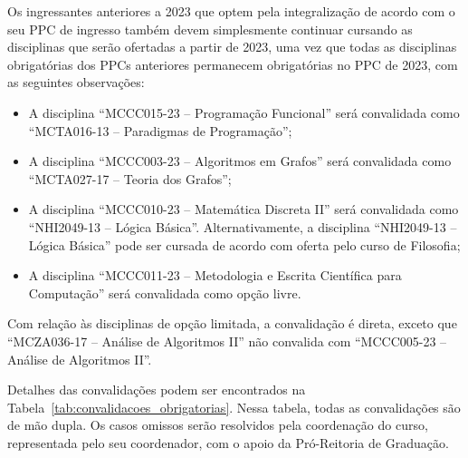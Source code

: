\documentclass[a4paper]{article}
\begin{document}
Os ingressantes anteriores a 2023 que optem pela integralização de acordo com o
seu PPC de ingresso também devem simplesmente continuar cursando as disciplinas
que serão ofertadas a partir de 2023, uma vez que todas as disciplinas
obrigatórias dos PPCs anteriores permanecem obrigatórias no PPC de 2023, com as
seguintes observações:
\begin{itemize}
    \item A disciplina ``MCCC015-23 -- Programação Funcional'' será convalidada
    como ``MCTA016-13 -- Paradigmas de Programação'';
    \item A disciplina ``MCCC003-23 -- Algoritmos em Grafos'' será convalidada
    como ``MCTA027-17 -- Teoria dos Grafos'';
    \item A disciplina ``MCCC010-23 -- Matemática Discreta II'' será
    convalidada como ``NHI2049-13 -- Lógica Básica''.  Alternativamente, a
    disciplina ``NHI2049-13 -- Lógica Básica'' pode ser cursada de acordo com
    oferta pelo curso de Filosofia;
    \item A disciplina ``MCCC011-23 -- Metodologia e Escrita Científica para
    Computação'' será convalidada como opção livre.
\end{itemize}
Com relação às disciplinas de opção limitada, a convalidação é direta, exceto
que ``MCZA036-17 -- Análise de Algoritmos II'' não convalida com
``MCCC005-23 -- Análise de Algoritmos II''.

Detalhes das convalidações podem ser encontrados na
Tabela~\ref{tab:convalidacoes_obrigatorias}.
Nessa tabela, todas as convalidações são de mão dupla.
Os casos omissos serão resolvidos pela coordenação do curso, representada pelo
seu coordenador, com o apoio da Pró-Reitoria de Graduação.


\newpage
\end{document}
